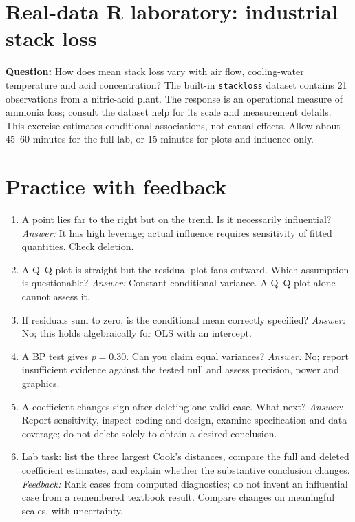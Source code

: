 \documentclass[11pt]{article}
\begin{document}
\section{Real-data R laboratory: industrial stack loss}
\textbf{Question:} How does mean stack loss vary with air flow, cooling-water temperature and acid concentration? The built-in \texttt{stackloss} dataset contains 21 observations from a nitric-acid plant. The response is an operational measure of ammonia loss; consult the dataset help for its scale and measurement details. This exercise estimates conditional associations, not causal effects. Allow about 45--60 minutes for the full lab, or 15 minutes for plots and influence only.

\section{Practice with feedback}
\begin{enumerate}
\item A point lies far to the right but on the trend. Is it necessarily influential? \textit{Answer:} It has high leverage; actual influence requires sensitivity of fitted quantities. Check deletion.
\item A Q--Q plot is straight but the residual plot fans outward. Which assumption is questionable? \textit{Answer:} Constant conditional variance. A Q--Q plot alone cannot assess it.
\item If residuals sum to zero, is the conditional mean correctly specified? \textit{Answer:} No; this holds algebraically for OLS with an intercept.
\item A BP test gives $p=0.30$. Can you claim equal variances? \textit{Answer:} No; report insufficient evidence against the tested null and assess precision, power and graphics.
\item A coefficient changes sign after deleting one valid case. What next? \textit{Answer:} Report sensitivity, inspect coding and design, examine specification and data coverage; do not delete solely to obtain a desired conclusion.
\item Lab task: list the three largest Cook's distances, compare the full and deleted coefficient estimates, and explain whether the substantive conclusion changes. \textit{Feedback:} Rank cases from computed diagnostics; do not invent an influential case from a remembered textbook result. Compare changes on meaningful scales, with uncertainty.
\end{enumerate}
\end{document}
